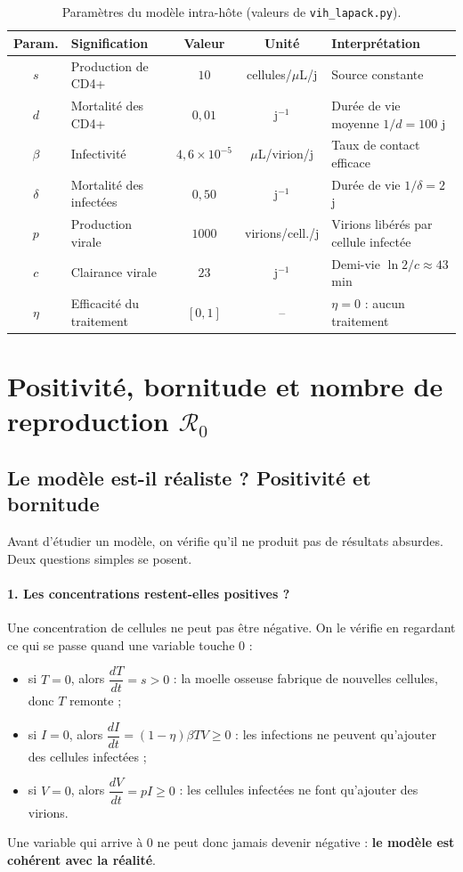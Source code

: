 \documentclass[11pt,a4paper]{report}
\theoremstyle{plain}
\theoremstyle{definition}
\theoremstyle{remark}
\newcommand{\Rzero}{\mathcal{R}_0}
\begin{document}
\begin{table}[ht]
\centering
\caption{Paramètres du modèle intra-hôte (valeurs de \texttt{vih\_lapack.py}).}
\label{tab:params_intra}
\begin{tabularx}{\textwidth}{c p{4.2cm} c c X}
\toprule
\textbf{Param.} & \textbf{Signification} & \textbf{Valeur} & \textbf{Unité} & \textbf{Interprétation} \\
\midrule
$s$ & Production de CD4+ & $10$ & cellules/$\mu$L/j & Source constante \\
$d$ & Mortalité des CD4+ & $0{,}01$ & j$^{-1}$ & Durée de vie moyenne $1/d=100$ j \\
$\beta$ & Infectivité & $4{,}6\times10^{-5}$ & $\mu$L/virion/j & Taux de contact efficace \\
$\delta$ & Mortalité des infectées & $0{,}50$ & j$^{-1}$ & Durée de vie $1/\delta=2$ j \\
$p$ & Production virale & $1000$ & virions/cell./j & Virions libérés par cellule infectée \\
$c$ & Clairance virale & $23$ & j$^{-1}$ & Demi-vie $\ln 2/c\approx 43$ min \\
$\eta$ & Efficacité du traitement & $[0,1]$ & -- & $\eta=0$ : aucun traitement \\
\bottomrule
\end{tabularx}
\end{table}

\section{Positivité, bornitude et nombre de reproduction $\Rzero$}

\subsection*{Le modèle est-il réaliste ? Positivité et bornitude}

Avant d'étudier un modèle, on vérifie qu'il ne produit pas de résultats absurdes. Deux questions simples se posent.

\paragraph{1. Les concentrations restent-elles positives ?} Une concentration de cellules ne peut pas être négative. On le vérifie en regardant ce qui se passe quand une variable touche $0$ :
\begin{itemize}
    \item si $T=0$, alors $\dfrac{dT}{dt}=s>0$ : la moelle osseuse fabrique de nouvelles cellules, donc $T$ remonte ;
    \item si $I=0$, alors $\dfrac{dI}{dt}=(1-\eta)\beta TV\ge0$ : les infections ne peuvent qu'ajouter des cellules infectées ;
    \item si $V=0$, alors $\dfrac{dV}{dt}=pI\ge0$ : les cellules infectées ne font qu'ajouter des virions.
\end{itemize}
Une variable qui arrive à $0$ ne peut donc jamais devenir négative : \textbf{le modèle est cohérent avec la réalité}.
\end{document}
